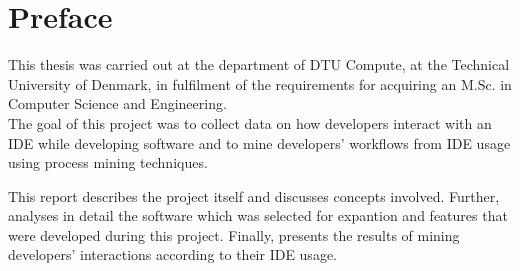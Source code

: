\chapter{Preface}
\vspace{-15mm}
This thesis was carried out at the department of DTU Compute, at the Technical University of Denmark, in fulfilment of the requirements for acquiring an M.Sc. in Computer Science and Engineering.\\
The goal of this project was to collect data on how developers interact with an IDE while developing software and to mine developers' workflows from IDE usage using process mining techniques. 

This report describes the project itself and discusses concepts involved. Further, analyses in detail the software which was selected for expantion and features that were developed during this project. Finally, presents the results of mining developers' interactions according to their IDE usage.
